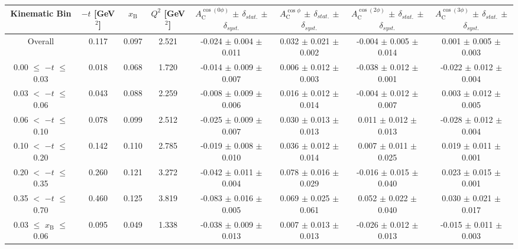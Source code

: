 \begin{table}[width=15cm]
 \begin{center}
\resizebox{16cm}{!} {
  \begin{tabular}{|c|c|c|c|c|c|c|c|}
\hline
Kinematic Bin &  $-t$ [GeV$^{2}$] & $x_{\textrm{B}}$ & $Q^{2}$ [GeV$^{2}$] & 
$A_{\textrm{C}}^{\cos(0\phi)}$ $\pm$ $\delta_{stat.}$ $\pm$ $\delta_{syst.}$ & $A_{\textrm{C}}^{\cos \phi}$ $\pm$ $\delta_{stat.}$ $\pm$ $\delta_{syst.}$
& $A_{\textrm{C}}^{\cos(2\phi)}$ $\pm$ $\delta_{stat.}$ $\pm$ $\delta_{syst.}$ & $A_{\textrm{C}}^{\cos(3\phi)}$ $\pm$ $\delta_{stat.}$ $\pm$ $\delta_{syst.}$ \\
\hline
\hline
Overall &  0.117 & 0.097 &  2.521 &  -0.024 $\pm$  0.004 $\pm$  0.011 & 
0.032  $\pm$  0.021 $\pm$   0.002 &  -0.004  $\pm$  0.005  $\pm$   0.014 &  0.001  $\pm$   0.005   $\pm$   0.003 \\
\hline
0.00 $\leqslant$ $-t$ $\leqslant$ 0.03 &  0.018 & 0.068 &  1.720 &  -0.014  $\pm$  0.009 $\pm$ 0.007 & 
0.006  $\pm$  0.012  $\pm$   0.003 &  -0.038  $\pm$  0.012 $\pm$  0.001 &  -0.022   $\pm$  0.012   $\pm$   0.004\\
0.03 $<$ $-t$ $\leqslant$ 0.06 &  0.043 & 0.088 &  2.259& -0.008  $\pm$  0.009  $\pm$   0.006 &
0.016 $\pm$  0.012  $\pm$   0.014 &  -0.004  $\pm$  0.012  $\pm$  0.007 &  0.003   $\pm$  0.012   $\pm$   0.005\\
0.06 $<$ $-t$ $\leqslant$ 0.10 &  0.078 & 0.099 &  2.512 & -0.025  $\pm$  0.009  $\pm$  0.007 & 
0.030 $\pm$  0.013  $\pm$   0.013 & 0.011  $\pm$  0.012 $\pm$   0.013 &  -0.028   $\pm$  0.012  $\pm$    0.004\\
0.10 $<$ $-t$ $\leqslant$ 0.20 &  0.142 & 0.110 &  2.785 &  -0.019  $\pm$  0.008   $\pm$  0.010 & 
0.036 $\pm$  0.012  $\pm$   0.014 &  0.007  $\pm$  0.011  $\pm$  0.025 & 0.019   $\pm$  0.011    $\pm$  0.001\\
0.20 $<$ $-t$ $\leqslant$ 0.35 &  0.260 & 0.121 &  3.272 &  -0.042 $\pm$   0.011  $\pm$  0.004 &
0.078 $\pm$  0.016  $\pm$ 0.029 & -0.016 $\pm$   0.015  $\pm$  0.040 & 0.023  $\pm$   0.015   $\pm$   0.001\\
0.35 $<$ $-t$ $\leqslant$ 0.70 &  0.460 & 0.125 &  3.819 &  -0.083  $\pm$  0.016  $\pm$   0.005 & 
0.069 $\pm$  0.025  $\pm$   0.061 & 0.052 $\pm$   0.022  $\pm$  0.040 & 0.030   $\pm$  0.021   $\pm$ 0.017\\
\hline
0.03 $\leqslant$ $x_{\textrm{B}}$ $\leqslant$ 0.06 &  0.095 & 0.049 &  1.338 &  -0.038  $\pm$  0.009  $\pm$   0.013 & 
 0.007  $\pm$  0.013  $\pm$   0.013 & -0.026 $\pm$  0.012 $\pm$   0.013 &  -0.015   $\pm$  0.011  $\pm$    0.003\\

\end{tabular}}
\end{center}
\end{table}
